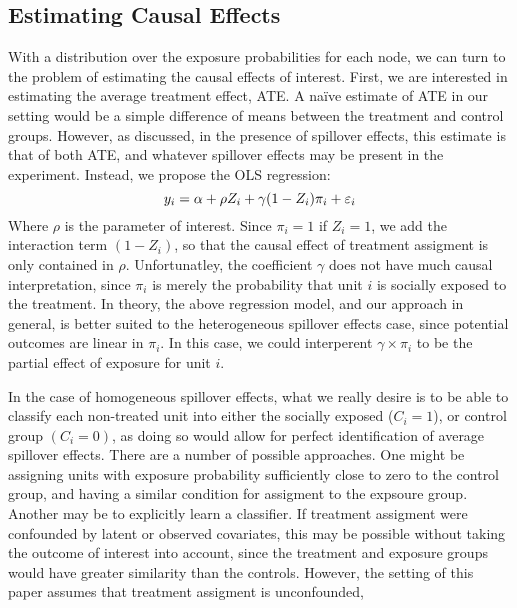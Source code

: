 \documentclass{article}
\begin{document}
\subsection{Estimating Causal Effects}

With a distribution over the exposure probabilities for each node, we can turn to the problem of estimating the causal effects of interest. 
First, we are interested in estimating the average treatment effect, ATE. A naïve estimate of ATE in our setting would be a simple difference of means 
between the treatment and control groups. However, as discussed, in the presence of spillover effects, this estimate is that of both ATE, and whatever spillover 
effects may be present in the experiment. Instead, we propose the OLS regression: 
\begin{equation}
  y_i = \alpha + \rho Z_i + \gamma (1 - Z_i) \pi_i + \varepsilon_i \\[1.0ex]
\end{equation}
Where $\rho$ is the parameter of interest. Since $\pi_i = 1$ if $Z_i = 1$, we add the interaction term $(1 - Z_i)$, so that the causal effect of
treatment assigment is only contained in $\rho$. Unfortunatley, the coefficient $\gamma$ does not have much causal interpretation, since $\pi_i$ is merely the probability that unit $i$
is socially exposed to the treatment. In theory, the above regression model, and our approach in general, is better suited to the heterogeneous spillover effects case, since potential outcomes are linear in $\pi_i$. 
In this case, we could interperent $\gamma \times \pi_i$ to be the partial effect of exposure for unit $i$. 

In the case of homogeneous spillover effects, what we really desire is to be able to classify each non-treated unit into either the socially exposed ($C_i = 1$), or control group $(C_i = 0)$, as doing so 
would allow for perfect identification of average spillover effects. There are a number of possible approaches. One might be assigning units with exposure probability sufficiently close to zero to the control group, 
and having a similar condition for assigment to the expsoure group. Another may be to explicitly learn a classifier. If treatment assigment were confounded by latent or observed covariates, this may be possible without 
taking the outcome of interest into account, since the treatment and exposure groups would have greater similarity than the controls. However, the setting of this paper assumes that treatment assigment is unconfounded, 
\end{document}
